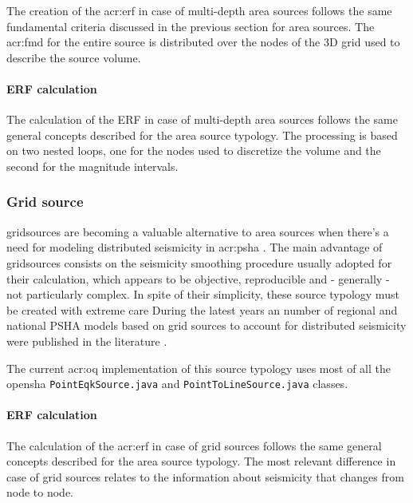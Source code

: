 The creation of the \gls{acr:erf} in case of multi-depth area sources
follows the same fundamental criteria discussed in the previous section 
for area sources. 
%
The \gls{acr:fmd} for the entire source is distributed over the nodes 
of the 3D grid used to describe the source volume.
%
\paragraph{ERF calculation}
The calculation of the ERF in case of multi-depth area sources follows
the same general concepts described for the area source typology.
%
The processing is based on two nested loops, one for the nodes 
used to discretize the volume and the second for the magnitude intervals. 

%
\subsubsection{Grid source}
\Glspl{gridsource} are becoming a valuable alternative
to area sources when there's a need for modeling distributed 
seismicity in \gls{acr:psha} \citep{frankel1995}. 
%
The main advantage of \glspl{gridsource} consists on the seismicity 
smoothing procedure usually adopted for their calculation, which appears
to be objective, reproducible and - generally - not particularly complex. 
%
In spite of their simplicity, these source typology must be created 
with extreme care \citep[][page 9]{abrahamson2006}
%
During the latest years an number of regional and national PSHA models 
based on grid sources to account for distributed seismicity were 
published in the literature \citep{stirling2002,petersen2008}. 

%
The current \gls{acr:oq} implementation of this source typology 
uses most of all the \gls{opensha} \texttt{PointEqkSource.java}
and \texttt{PointToLineSource.java} classes.
%
\paragraph{ERF calculation}
The calculation of the \gls{acr:erf} in case of grid sources follows 
the same general concepts described for the area source typology.
The most relevant difference in case of grid sources relates to the 
information about seismicity that changes from node to node.

